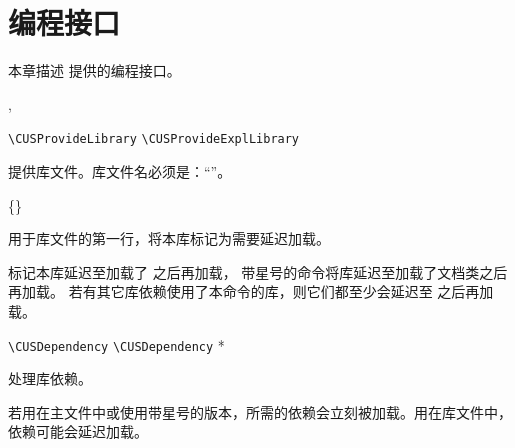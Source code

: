 \documentclass{cusdoc}
\begin{document}



\chapter{编程接口}

本章描述 \CusTeX 提供的编程接口。

\begin{function}[module=cus]{\CUSProvideLibrary,\CUSProvideExplLibrary}
\begin{syntax}
  \verb|\CUSProvideLibrary|      
  \verb|\CUSProvideExplLibrary|    
\end{syntax}
提供库文件。库文件名必须是：“”。
\end{function}

\begin{function}[module=cus]{\CUSLibraryDelayedUntil}
  \begin{syntax}
    \V\CUSLibraryDelayedUntil   {}
    \V\CUSLibraryDelayedUntil * \{\}
    \V\CUSLibraryDelayedUntil * 
  \end{syntax}
用于库文件的第一行，将本库标记为需要延迟加载。

标记本库延迟至加载了  之后再加载，
带星号的命令将库延迟至加载了文档类之后再加载。
若有其它库依赖使用了本命令的库，则它们都至少会延迟至  之后再加载。
\end{function}

\begin{function}[module=cus]{\CUSDependency}
\begin{syntax}
  \verb|\CUSDependency|   
  \verb|\CUSDependency| * 
\end{syntax}
处理库依赖。

若用在主文件中或使用带星号的版本，所需的依赖会立刻被加载。用在库文件中，依赖可能会延迟加载。
\end{function}
\end{document}

